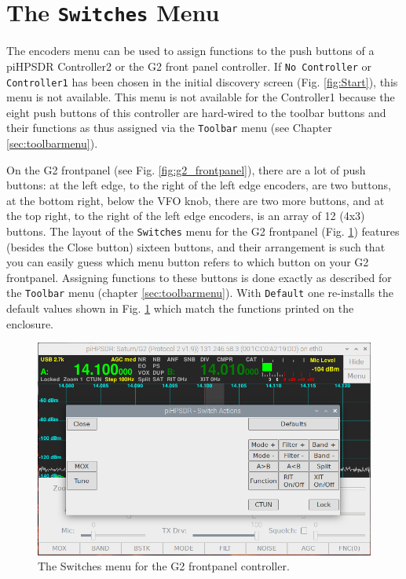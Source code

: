 \documentclass[12pt]{book}
\def\rett#1{\texttt{\color{red}#1}}
\def\bltt#1{\texttt{\color{blue}#1}}
\begin{document}
\section{The \texttt{Switches} Menu}

The encoders menu can be used to assign functions to the push buttons of a
piHPSDR  Controller2 or the G2 front panel controller.
If \texttt{No Controller} or \texttt{Controller1} has been chosen in the initial discovery screen
(Fig. \ref{fig:Start}), this menu is not available. This menu is not available
for the Controller1 because the eight push buttons of this controller are hard-wired to
the toolbar buttons and their functions as thus assigned via the \bltt{Toolbar} menu
(see Chapter \ref{sec:toolbarmenu}). 

On the G2 frontpanel (see Fig. \ref{fig:g2_frontpanel}),
 there are a lot of push buttons: at the left edge, to the right
of the left edge encoders, are two buttons, at the bottom right, below the VFO knob,
there are two more buttons, and at the top right, to the right of the left edge
encoders, is an array of 12 (4x3) buttons. The layout of the \bltt{Switches} menu
for the G2 frontpanel (Fig. \ref{fig:SwitchMenuG2}) features (besides the Close
button) sixteen buttons, and their arrangement is such that you can easily guess
which menu button refers to which button on your G2 frontpanel. Assigning functions
to these buttons is done exactly as described for the \bltt{Toolbar} menu
(chapter \ref{sec:toolbarmenu}). With \rett{Default} one re-installs the default values
shown in Fig. \ref{fig:SwitchMenuG2} which match the functions printed on the enclosure.

\begin{figure}[ht]
\center
\includegraphics[width=12cm]{SwitchMenuG2.png}
\caption{The Switches menu for the G2 frontpanel controller.}
\label{fig:SwitchMenuG2}
\end{figure}
\end{document}
